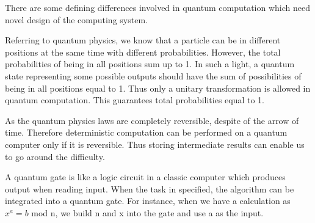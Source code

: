 \documentclass{paper}
\begin{document}
There are some defining differences involved in quantum computation which need novel design of the computing system.


Referring to quantum physics, we know that a particle can be in different positions at the same time with different probabilities. However, the total probabilities of being in all positions sum up to 1. In such a light, a quantum state representing some possible outputs should have the sum of possibilities of being in all positions equal to 1. Thus only a unitary transformation is allowed in quantum computation. This guarantees total probabilities equal to 1.


As the quantum physics laws are completely reversible, despite of the arrow of time. Therefore deterministic computation can be performed on a quantum computer only if it is reversible. Thus storing intermediate results can enable us to go around the difficulty.


A quantum gate is like a logic circuit in a classic computer which produces output when reading input. When the task in specified, the algorithm can be integrated into a quantum gate. For instance, when we have a calculation as $x^a=b$ mod n, we build n and x into the gate and use a as the input.
\end{document}
